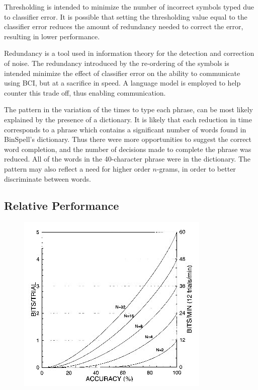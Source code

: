 \documentclass[12pt,titlepage]{article}
\begin{document}
Thresholding is intended to minimize the number of incorrect symbols typed due to classifier 
error.  It is possible that setting the thresholding value equal to the classifier error reduces the 
amount of redundancy needed to correct the error, resulting in lower performance.

Redundancy is a tool used in information theory for the detection and correction of noise.  The 
redundancy introduced by the re-ordering of the symbols is intended minimize the effect of 
classifier error on the ability to communicate using BCI, but at a sacrifice in speed.  A language 
model is employed to help counter this trade off, thus enabling communication.

The pattern in the variation of the times to type each phrase, can be most likely explained by 
the presence of a dictionary.  It is likely that each reduction in time corresponds to a phrase 
which contains a significant number of words found in BinSpell's dictionary.  Thus there were 
more opportunities to suggest the correct word completion, and the number of decisions made 
to complete the phrase was reduced.  All of the words in the 40-character phrase were in the 
dictionary.  The pattern may also reflect a need for higher order $n$-grams, in order to better 
discriminate between words.

\subsection{Relative Performance}

\begin{figure}[h]
\begin{center}
	\includegraphics[scale=0.40]{fig12.jpg}
	\label{fig:itrvsacc}
\end{center}
\end{figure}
\end{document}
